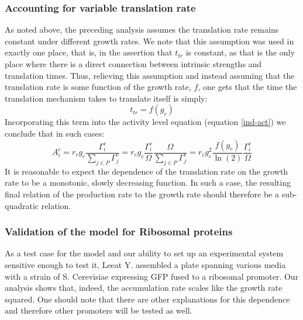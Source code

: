 \documentclass{report}
\begin{document}
\subsubsection{Accounting for variable translation rate}
As noted above, the preceding analysis assumes the translation rate remains constant under different growth rates.
We note that this assumption was used in exactly one place, that is, in the assertion that $t_{tr}$ is constant, as that is the only place where there is a direct connection between intrinsic strengths and translation times.
Thus, relieving this assumption and instead assuming that the translation rate is some function of the growth rate, $f$, one gets that the time the translation mechanism takes to translate itself is simply:
\begin{equation}
t_{tr}=f(g_c)
\end{equation}
Incorporating this term into the activity level equation (equation \ref{ind-act}) we conclude that in such cases:
\begin{equation}
A^c_i=r_c g_c \frac{\Gamma^c_i}{\sum_{j\in P}\Gamma^c_j}=r_c g_c \frac{\Gamma^c_i}{\Omega}\frac{\Omega}{\sum_{j\in P}\Gamma^c_j}=r_c g_c^2\frac{f(g_c)}{\ln(2)}\frac{\Gamma^c_i}{\Omega}
\end{equation}
It is reasonable to expect the dependence of the translation rate on the growth rate to be a monotonic, slowly decreasing function.
In such a case, the resulting final relation of the production rate to the growth rate should therefore be a sub-quadratic relation.
\subsubsection{Validation of the model for Ribosomal proteins}
As a test case for the model and our ability to set up an experimental system sensitive enough to test it, Leeat Y. assembled a plate spanning various media with a strain of S. Cerevisiae expressing GFP fused to a ribosomal promoter.
Our analysis shows that, indeed, the accumulation rate scales like the growth rate squared.
One should note that there are other explanations for this dependence and therefore other promoters will be tested as well.
\end{document}
